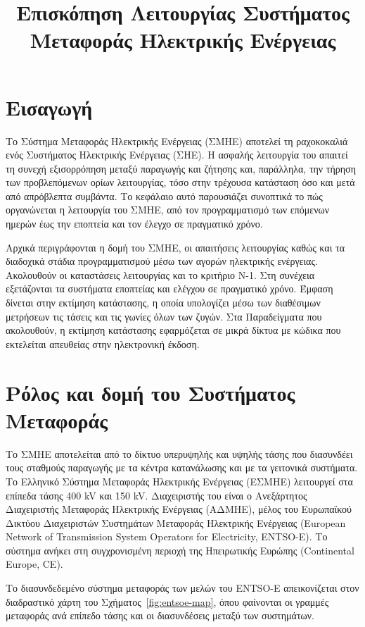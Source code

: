 \title{Επισκόπηση Λειτουργίας Συστήματος Μεταφοράς Ηλεκτρικής Ενέργειας}

\section{Εισαγωγή}
\label{kef-01-theoria}

Το Σύστημα Μεταφοράς Ηλεκτρικής Ενέργειας (ΣΜΗΕ) αποτελεί τη ραχοκοκαλιά ενός Συστήματος
Ηλεκτρικής Ενέργειας (ΣΗΕ). Η ασφαλής λειτουργία του απαιτεί τη συνεχή εξισορρόπηση μεταξύ
παραγωγής και ζήτησης και, παράλληλα, την τήρηση των προβλεπόμενων ορίων λειτουργίας, τόσο στην τρέχουσα κατάσταση όσο
και μετά από απρόβλεπτα συμβάντα. Το κεφάλαιο αυτό παρουσιάζει συνοπτικά το πώς οργανώνεται η
λειτουργία του ΣΜΗΕ, από τον προγραμματισμό των επόμενων ημερών έως την εποπτεία και τον
έλεγχο σε πραγματικό χρόνο.

Αρχικά περιγράφονται η δομή του ΣΜΗΕ, οι απαιτήσεις λειτουργίας καθώς και τα
διαδοχικά στάδια προγραμματισμού μέσω των αγορών ηλεκτρικής ενέργειας. Ακολουθούν οι καταστάσεις λειτουργίας και το κριτήριο N-1. Στη συνέχεια εξετάζονται τα συστήματα εποπτείας και ελέγχου σε πραγματικό χρόνο.
Έμφαση δίνεται στην εκτίμηση κατάστασης, η οποία υπολογίζει μέσω των διαθέσιμων μετρήσεων τις
τάσεις και τις γωνίες όλων των ζυγών. Στα
Παραδείγματα που ακολουθούν, η εκτίμηση κατάστασης εφαρμόζεται σε μικρά δίκτυα με κώδικα που
εκτελείται απευθείας στην ηλεκτρονική έκδοση.


\section{Ρόλος και δομή του Συστήματος Μεταφοράς}

Το ΣΜΗΕ αποτελείται από το δίκτυο υπερυψηλής και υψηλής τάσης που διασυνδέει τους σταθμούς παραγωγής με τα κέντρα κατανάλωσης και με τα γειτονικά
συστήματα. Το Ελληνικό Σύστημα Μεταφοράς Ηλεκτρικής Ενέργειας (ΕΣΜΗΕ) λειτουργεί στα επίπεδα
τάσης 400 kV και 150 kV. Διαχειριστής του είναι ο Ανεξάρτητος Διαχειριστής Μεταφοράς
Ηλεκτρικής Ενέργειας (ΑΔΜΗΕ), μέλος του Ευρωπαϊκού Δικτύου Διαχειριστών Συστημάτων Μεταφοράς
Ηλεκτρικής Ενέργειας (European Network of Transmission System
Operators for Electricity, ENTSO-E). Το σύστημα ανήκει στη
συγχρονισμένη περιοχή της Ηπειρωτικής Ευρώπης (Continental Europe, CE).

Το διασυνδεδεμένο σύστημα μεταφοράς των μελών του ENTSO-E απεικονίζεται στον διαδραστικό
χάρτη του Σχήματος~\ref{fig:entsoe-map}, όπου φαίνονται οι γραμμές μεταφοράς ανά επίπεδο
τάσης και οι διασυνδέσεις μεταξύ των συστημάτων.

